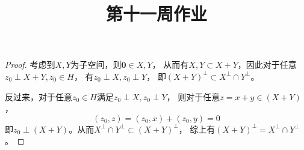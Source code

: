 \documentclass[cn]{homework}
\title{第十一周作业}
\begin{document}
    \maketitle

    \problem

    \problem
    \begin{proof}
        考虑到$X,Y$为子空间，则$\boldsymbol 0\in X,Y$，
        从而有$X,Y\subset X+Y$，因此对于任意$z_0\perp X+Y,z_0\in H$，
        有$z_0\perp X,z_0\perp Y$，
        即$(X+Y)^\perp\subset X^\perp\cap Y^\perp$。

        反过来，对于任意$z_0\in H$满足$z_0\perp X,z_0\perp Y$，
        则对于任意$z=x+y\in (X+Y)$，
        \[(z_0,z)=(z_0,x)+(z_0,y)=0\]
        即$z_0\perp (X+Y)$。从而$X^\perp\cap Y^\perp\subset (X+Y)^\perp$，
        综上有$(X+Y)^\perp=X^\perp\cap Y^\perp$。
    \end{proof}
\end{document}
